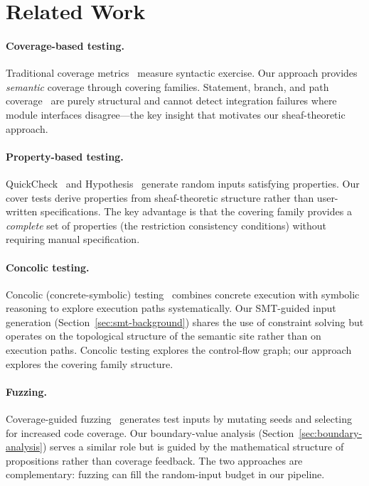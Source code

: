 \documentclass[11pt]{article}
\begin{document}
\section{Related Work}\label{sec:related}

\paragraph{Coverage-based testing.}
Traditional coverage metrics~\cite{Zhu1997} measure syntactic exercise.
Our approach provides \emph{semantic} coverage through covering families.
Statement, branch, and path coverage~\cite{Ammann2016} are purely structural
and cannot detect integration failures where module interfaces disagree---the
key insight that motivates our sheaf-theoretic approach.

\paragraph{Property-based testing.}
QuickCheck~\cite{Claessen2000} and Hypothesis~\cite{MacIver2019} generate
random inputs satisfying properties.  Our cover tests derive properties
from sheaf-theoretic structure rather than user-written specifications.
The key advantage is that the covering family provides a \emph{complete}
set of properties (the restriction consistency conditions) without
requiring manual specification.

\paragraph{Concolic testing.}
Concolic (concrete-symbolic) testing~\cite{Sen2005,Godefroid2005} combines
concrete execution with symbolic reasoning to explore execution paths
systematically.  Our SMT-guided input generation
(Section~\ref{sec:smt-background}) shares the use of constraint solving
but operates on the topological structure of the semantic site rather than
on execution paths.  Concolic testing explores the control-flow graph;
our approach explores the covering family structure.

\paragraph{Fuzzing.}
Coverage-guided fuzzing~\cite{Zalewski2014,Boehme2017} generates test
inputs by mutating seeds and selecting for increased code coverage.
Our boundary-value analysis (Section~\ref{sec:boundary-analysis})
serves a similar role but is guided by the mathematical structure of
propositions rather than coverage feedback.  The two approaches are
complementary: fuzzing can fill the random-input budget in our pipeline.
\end{document}
